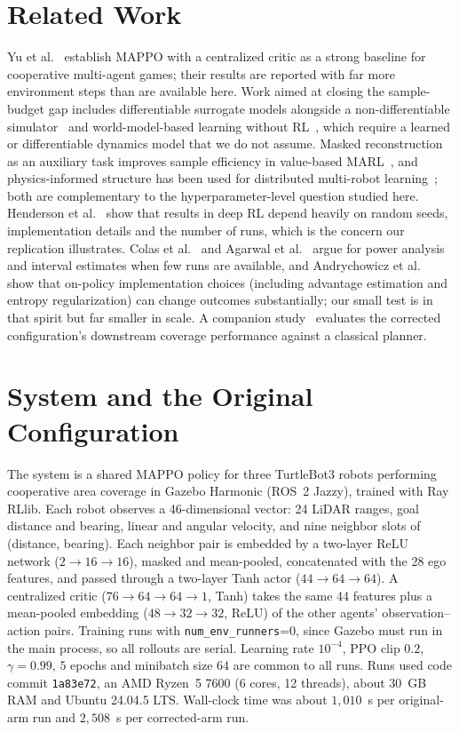 \documentclass[12pt]{article}
\begin{document}
\section{Related Work}
Yu et al.~\cite{yu2022mappo} establish MAPPO with a centralized critic as a
strong baseline for cooperative multi-agent games; their results are
reported with far more environment steps than are available here. Work aimed
at closing the sample-budget gap includes differentiable surrogate models
alongside a non-differentiable simulator~\cite{asymmetricphysics2026} and
world-model-based learning without RL~\cite{agilemotor2024}, which require a
learned or differentiable dynamics model that we do not assume. Masked
reconstruction as an auxiliary task improves sample efficiency in
value-based MARL~\cite{maskedreconstruction2023}, and physics-informed
structure has been used for distributed multi-robot
learning~\cite{physicsinformedmarl2024}; both are complementary to the
hyperparameter-level question studied here. Henderson et
al.~\cite{henderson2018deep} show that results in deep RL depend heavily on
random seeds, implementation details and the number of runs, which is the
concern our replication illustrates. Colas et al.~\cite{colas2018many} and
Agarwal et al.~\cite{agarwal2021precipice} argue for power analysis and
interval estimates when few runs are available, and Andrychowicz et
al.~\cite{andrychowicz2021matters} show that on-policy implementation
choices (including advantage estimation and entropy regularization) can
change outcomes substantially; our small test is in that spirit but far
smaller in scale. A companion study~\cite{pandhe2026mappo}
evaluates the corrected configuration's downstream coverage performance
against a classical planner.

\section{System and the Original Configuration}
\label{sec:system}
The system is a shared MAPPO policy for three TurtleBot3 robots performing
cooperative area coverage in Gazebo Harmonic (ROS~2 Jazzy), trained with Ray
RLlib. Each robot observes a 46-dimensional vector: 24 LiDAR ranges, goal
distance and bearing, linear and angular velocity, and nine neighbor slots of
(distance, bearing). Each neighbor pair is embedded by a two-layer ReLU
network ($2\to16\to16$), masked and mean-pooled, concatenated with the 28 ego
features, and passed through a two-layer Tanh actor ($44\to64\to64$). A
centralized critic ($76\to64\to64\to1$, Tanh) takes the same 44 features plus
a mean-pooled embedding ($48\to32\to32$, ReLU) of the other agents'
observation--action pairs. Training runs with \texttt{num\_env\_runners}=0,
since Gazebo must run in the main process, so all rollouts are serial.
Learning rate $10^{-4}$, PPO clip $0.2$, $\gamma=0.99$, $5$ epochs and
minibatch size $64$ are common to all runs. Runs used code commit \texttt{1a83e72}, an AMD Ryzen~5 7600 (6 cores, 12 threads), about 30~GB RAM and Ubuntu 24.04.5 LTS. Wall-clock time was about $1{,}010$~s per original-arm run and $2{,}508$~s per corrected-arm run.
\end{document}
